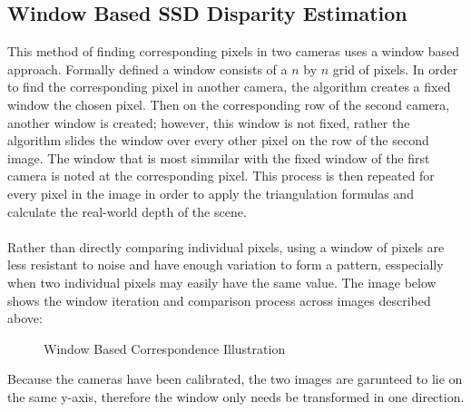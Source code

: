 \documentclass[11pt]{scrartcl}
\begin{document}
\subsection{Window Based SSD Disparity Estimation}
This method of finding corresponding pixels in two cameras uses a window based approach. 
Formally defined a window consists of a $n$ by $n$ grid of pixels. In order to find the 
corresponding pixel in another camera, the algorithm creates a fixed window the chosen pixel. 
Then on the corresponding row of the second camera, another window is created; however, 
this window is not fixed, rather the algorithm slides the window over every other pixel 
on the row of the second image. The window that is most simmilar with the fixed window 
of the first camera is noted at the corresponding pixel. This process is then repeated 
for every pixel in the image in order to apply the triangulation formulas and calculate the 
real-world depth of the scene. 
\\
\\
Rather than directly comparing individual pixels, using a window of pixels 
are less resistant to noise and have enough variation to form a pattern, 
esspecially when two individual pixels may easily have the same value. The image 
below shows the window iteration and comparison process across images described above:

\begin{figure}[!htb]
    \centering
    \caption{Window Based Correspondence Illustration}
\end{figure}


\begin{remark}
    Because the cameras have been calibrated, the two images are garunteed to lie 
    on the same y-axis, therefore the window only needs be transformed in one 
    direction. 
\end{remark}
\\
\end{document}
